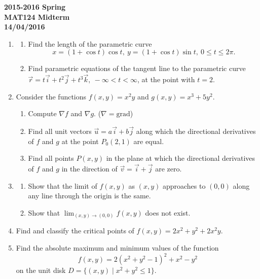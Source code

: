 \documentclass[a4paper, 12pt]{article}
\begin{document}
\pagestyle{empty}

\begin{center}
\textbf{2015-2016 Spring \\MAT124 Midterm\\14/04/2016}
\end{center}

\begin{enumerate}[leftmargin=*,label=\textbf{\arabic*.}]

\item \begin{enumerate}[leftmargin=*,label=\textbf{\alph*.}]
\item Find the length of the parametric curve
\[x= (1+\cos t)\cos t, \: y=(1+\cos t)\sin t,\: 0\leq t\leq 2\pi.\]
\item Find parametric equations of the tangent line to the parametric curve \linebreak $\vec r= t\vec{i}+t^2\vec{j}+t^3\vec{k},\:-\infty<t<\infty$, at the point with $t=2$.
\end{enumerate}

\item Consider the functions $f(x,y)=x^2y$ and $g(x,y)=x^3+5y^2$.
\begin{enumerate}[leftmargin=*,label=\textbf{\alph*.}]
\item Compute $\nabla f$ and $\nabla g$. ($\nabla=\text{grad}$)
\item Find all unit vectors $\vec u=a\vec i+b\vec j$ along which the directional derivatives of $f$ and $g$ at the point $P_0(2,1)$ are equal.
\item Find all points $P(x,y)$ in the plane at which the directional derivatives of $f$ and $g$ in the direction of $\vec v=\vec i+\vec j$ are zero.
\end{enumerate}

\item \begin{enumerate}[leftmargin=*,label=\textbf{\alph*.}]
\item Show that the limit of $f(x,y)$ as $(x,y)$ approaches to $(0,0)$ along any line through the origin is the same.
\item Show that $\displaystyle\lim_{(x,y)\to(0,0)}f(x,y)$ does not exist.
\end{enumerate}

\item Find and classify the critical points of $f(x,y)=2x^2+y^2+2x^2y$.

\item Find the absolute maximum and minimum values of the function
\[f(x,y)=2(x^2+y^2-1)^2+x^2-y^2\]
on the unit disk $D=\{(x,y)\mid x^2+y^2\leq 1\}$.

\end{enumerate}
\end{document}
